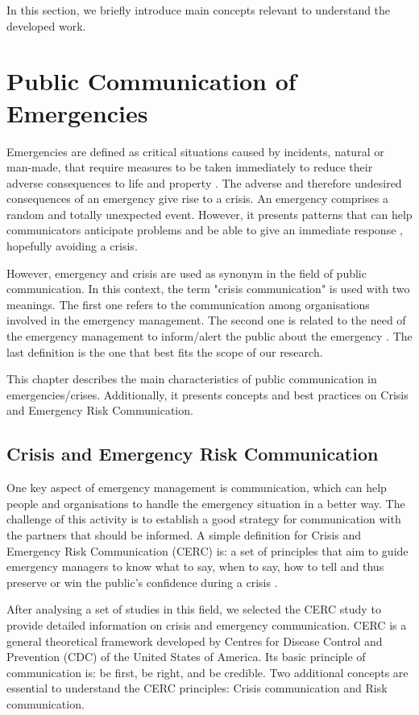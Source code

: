  \label{chapter:background}

In this section, we briefly introduce main concepts relevant to understand the developed work. 

\section{Public Communication of Emergencies} Emergencies are defined as critical situations caused by incidents, natural or man-made, that require measures to be taken immediately to reduce their adverse consequences to life and property \cite{dha1992internationally}. The adverse and therefore undesired consequences of an emergency give rise to a crisis.
An emergency comprises a random and totally unexpected event. However, it presents patterns that can help communicators anticipate problems and be able to give an immediate response \cite{cdc2014}, hopefully avoiding a crisis.

However, emergency and crisis are used as synonym in the field of public communication. In this context, the term "crisis communication" is used with two meanings. The first one refers to the communication among organisations involved in the emergency management. The second one is related to the need of the emergency management to inform/alert the public about the emergency \cite{cdc2014}. The last definition is the one that best fits the scope of our research.

This chapter describes the main characteristics of public communication in emergencies/crises. Additionally, it presents concepts and best practices on Crisis and Emergency Risk Communication.

\subsection{Crisis and Emergency Risk Communication}

One key aspect of emergency management is communication, which can help people and organisations to handle the emergency situation in a better way. The challenge of this activity is to establish a good strategy for communication with the partners that should be informed. A simple definition for Crisis and Emergency Risk Communication (CERC) is: a set of principles that aim to guide emergency managers to know what to say, when to say, how to tell and thus preserve or win the public's confidence during a crisis \cite{cdc2014}.

After analysing a set of studies in this field, we selected the CERC study \cite{cdc2014} to provide detailed information on crisis and emergency communication. CERC is a general theoretical framework developed by Centres for Disease Control and Prevention (CDC) of the United States of America. Its basic principle of communication is: be first, be right, and be credible.
Two additional concepts are essential to understand the CERC principles: Crisis communication and Risk communication.

